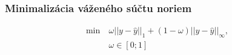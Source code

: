 \documentclass[presentation.tex]{subfiles}
\begin{document}
	
\begin{frame}
\frametitle{Minimalizácia váženého súčtu noriem}

\begin{align*}
	\min~ &\omega||y - \hat{y}||_1 + (1-\omega)||y - \hat{y}||_{\infty},\\
	&\omega \in [0;1]
\end{align*}


\end{frame}
	
\end{document}
